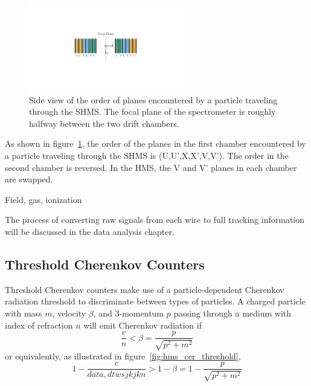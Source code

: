\begin{figure}[!h]
    \centering
    \includegraphics[width=0.6\textwidth]{chap3/dc_plane_order.pdf}
    \caption{Side view of the order of planes encountered by a particle
             traveling through the SHMS. The focal plane of the spectrometer
             is roughly halfway between the two drift chambers.}
    \label{fig:shms_plane_order}
\end{figure}

As shown in figure~\ref{fig:shms_plane_order}, the order of the planes in the
first chamber encountered by a particle traveling through the SHMS is
(U,U',X,X',V,V').
The order in the second chamber is reversed.
In the HMS, the V and V' planes in each chamber are swapped.

Field, gas, ionization

The process of converting raw signals from each wire to full tracking
information will be discussed in the data analysis chapter.

\subsection{Threshold Cherenkov Counters}
Threshold Cherenkov counters make use of a particle-dependent Cherenkov
radiation threshold to discriminate between types of particles.
A charged particle with mass $m$, velocity $\beta$, and 3-momentum $p$ passing
through a medium with index of refraction $n$ will emit Cherenkov radiation if
\begin{equation}
    \frac{c}{n} < \beta = \frac{p}{\sqrt{p^2+m^2}}
\end{equation}
or equivalently, as illustrated in figure~\ref{fig:hms_cer_threshold},
\begin{equation}
    1-\frac{c}{data,dtwsjkjkn} > 1-\beta = 1-\frac{p}{\sqrt{p^2+m^2}}
\end{equation}

